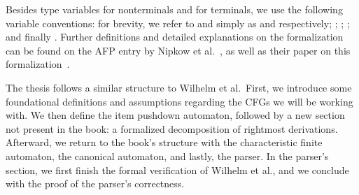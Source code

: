 \begin{isabellebody}
\begin{isamarkuptext}
Besides type variables  for nonterminals and  for terminals, we use the following 
variable conventions: for brevity, we refer to  and  simply as 
and  respectively; ; ; ; and finally
. Further definitions and detailed explanations on the formalization can be 
found on the AFP entry by Nipkow et al.~\cite{Nipkow-AFP}, as well as their paper on this
formalization~\cite{Nipkow-Paper}.%
\end{isamarkuptext}\isamarkuptrue%
%
\isadelimdocument
%
\endisadelimdocument
%
\isatagdocument
%
\isamarkuptrue%
%
\endisatagdocument
{\isafolddocument}%
%
\isadelimdocument
%
\endisadelimdocument
%
\begin{isamarkuptext}%
The thesis follows a similar structure to Wilhelm et al.\ First, we introduce some foundational
definitions and assumptions regarding the CFGs we will be working with. We then define the item
pushdown automaton, followed by a new section not present in the book: a formalized decomposition of
rightmost derivations. Afterward, we return to the book's structure with the characteristic finite
automaton, the canonical  automaton, and lastly, the  parser. In the parser's section,
we first finish the formal verification of Wilhelm et al., and we conclude with the
proof of the parser's correctness.%

\end{isamarkuptext}
\end{isabellebody}
